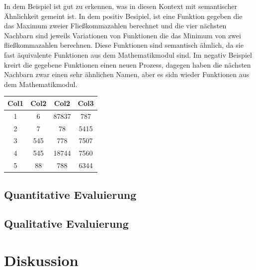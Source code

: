 \documentclass[12pt,letterpaper,ngerman]{article}
\begin{document}
In dem Beispiel ist gut zu erkennen, was in diesen Kontext mit semantischer
Ähnlichkeit gemeint ist. In dem positiv Besipiel, ist eine Funktion gegeben
die das Maximum zweier Fließkommazahlen berechnet und die vier
nächsten Nachbarn sind jeweils Variationen von Funktionen die das
Minimum von zwei fließkommazahlen berechnen. Diese Funktionen sind
semantisch ähnlich, da sie fast äquivalente Funktionen aus dem
Mathematikmodul sind. Im negativ Beispiel kreirt die 
gegebene Funktionen einen neuen Prozess, dagegen haben die nächsten
Nachbarn zwar einen sehr ähnlichen Namen, aber es sidn wieder Funktionen
aus dem Mathematikmodul.\\
\begin{center}
\begin{tabular}{||c c c c||} 
 \hline
 Col1 & Col2 & Col2 & Col3 \\ [0.5ex] 
 \hline\hline
 1 & 6 & 87837 & 787 \\ 
 \hline
 2 & 7 & 78 & 5415 \\
 \hline
 3 & 545 & 778 & 7507 \\
 \hline
 4 & 545 & 18744 & 7560 \\
 \hline
 5 & 88 & 788 & 6344 \\ [1ex] 
 \hline
\end{tabular}
\end{center}



\subsection{Quantitative Evaluierung} 
\subsection{Qualitative Evaluierung} 
\section{Diskussion}
\end{document}
